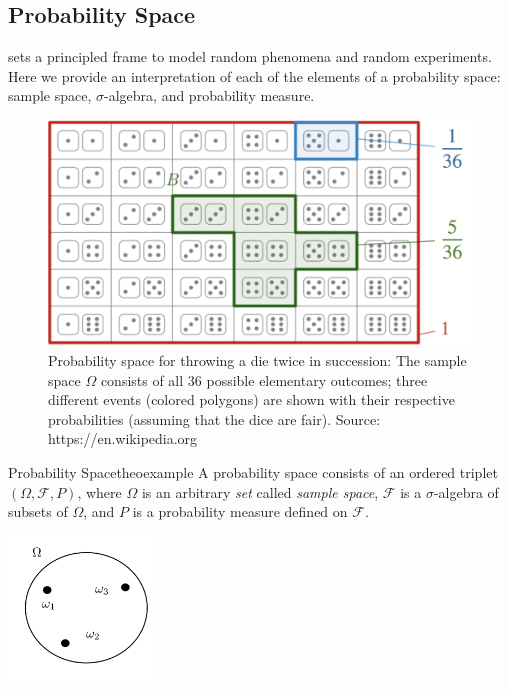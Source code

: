 \documentclass{tufte-handout}
\begin{document}
\subsection{Probability Space}
 sets a principled frame to model random phenomena and random experiments. 
Here we provide an interpretation of each of the elements of a probability space: sample space, $\sigma$-algebra, and probability measure.
\begin{figure}
\includegraphics{fig/dm.png}
\caption{Probability space for throwing a die twice in succession: The sample space 
$\Omega$  consists of all 36 possible elementary outcomes; three different events (colored polygons) are shown with their respective probabilities (assuming that the dice are fair). Source: https://en.wikipedia.org}
\end{figure}
\begin{mydef}{Probability Space}{theoexample}     
A probability space consists of an ordered triplet $(\Omega, \mathscr F, P)$, where $\Omega$ is an arbitrary \textit{set} called \textit{sample space},  $\mathscr F$ is a $\sigma$-algebra of subsets of $\Omega$, and $P$ is a probability measure defined on $\mathscr F$.
\end{mydef}



\begin{marginfigure}
\centering
\includegraphics[width=4cm]{fig/ss.png}
\caption{Sample space $\Omega$ containing three possible outcomes $\omega_1$, $\omega_2$, and $\omega_3$.
}
\end{marginfigure}
\end{document}
